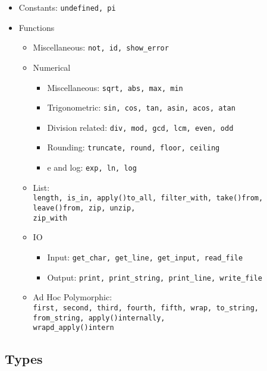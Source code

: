\documentclass{article}
\begin{document}
\begin{itemize}

\item Constants: \texttt{undefined, pi}

\item Functions
  \begin{itemize}

  \item Miscellaneous: \texttt{not, id, show_error}

  \item Numerical
    \begin{itemize}
    \item Miscellaneous: \texttt{sqrt, abs, max, min}
    \item Trigonometric: \texttt{sin, cos, tan, asin, acos, atan}
    \item Division related: \texttt{div, mod, gcd, lcm, even, odd}
    \item Rounding: \texttt{truncate, round, floor, ceiling}
    \item e and log: \texttt{exp, ln, log}
    \end{itemize}

  \item List:\\
    \texttt{length, is_in, apply()to_all, filter_with, take()from, leave()from,
    zip, unzip,\\ zip_with}

  \item IO
    \begin{itemize}
    \item Input: \texttt{get_char, get_line, get_input, read_file}
    \item Output: \texttt{print, print_string, print_line, write_file}
    \end{itemize}

  \item Ad Hoc Polymorphic:\\
  \texttt{first, second, third, fourth, fifth, wrap, to_string, from_string,
  apply()internally, \\wrapd_apply()intern}

  \end{itemize}
\end{itemize}

\subsection{Types}
\end{document}

